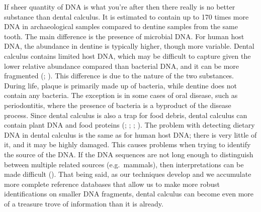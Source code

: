 \documentclass[
  b5paper,
]{book}
\begin{document}
If sheer quantity of DNA is what you're after then there really is no
better substance than dental calculus. It is estimated to contain up to
170 times more DNA in archaeological samples compared to dentine samples
from the same tooth. The main difference is the presence of microbial
DNA. For human host DNA, the abundance in dentine is typically higher,
though more variable. Dental calculus contains limited host DNA, which
may be difficult to capture given the lower relative abundance compared
than bacterial DNA, and it can be more fragmented
(;
). This
difference is due to the nature of the two substances. During life,
plaque is primarily made up of bacteria, while dentine does not contain
any bacteria. The exception is in some cases of oral disease, such as
periodontitis, where the presence of bacteria is a byproduct of the
disease process. Since dental calculus is also a trap for food debris,
dental calculus can contain plant DNA and food proteins
(; ;
;
).
The problem with detecting dietary DNA in dental calculus is the same as
for human host DNA; there is very little of it, and it may be highly
damaged. This causes problems when trying to identify the source of the
DNA. If the DNA sequences are not long enough to distinguish between
multiple related sources (e.g.~mammals), then interpretations can be
made difficult (). That being said, as our techniques develop and we accumulate
more complete reference databases that allow us to make more robust
identifications on smaller DNA fragments, dental calculus can become
even more of a treasure trove of information than it is already.
\end{document}
